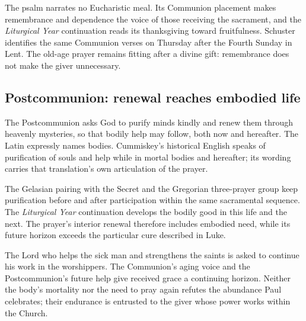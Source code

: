 The psalm narrates no Eucharistic meal. Its Communion placement makes remembrance and dependence the voice of those receiving the sacrament, and the \textit{Liturgical Year} continuation reads its thanksgiving toward fruitfulness. Schuster identifies the same Communion verses on Thursday after the Fourth Sunday in Lent. The old-age prayer remains fitting after a divine gift: remembrance does not make the giver unnecessary. 

\subsection*{Postcommunion: renewal reaches embodied life}
The Postcommunion asks God to purify minds kindly and renew them through heavenly mysteries, so that bodily help may follow, both now and hereafter. The Latin expressly names bodies. Cummiskey's historical English speaks of purification of souls and help while in mortal bodies and hereafter; its wording carries that translation's own articulation of the prayer.

The Gelasian pairing with the Secret and the Gregorian three-prayer group keep purification before and after participation within the same sacramental sequence. The \textit{Liturgical Year} continuation develops the bodily good in this life and the next. The prayer's interior renewal therefore includes embodied need, while its future horizon exceeds the particular cure described in Luke. 

The Lord who helps the sick man and strengthens the saints is asked to continue his work in the worshippers. The Communion's aging voice and the Postcommunion's future help give received grace a continuing horizon. Neither the body's mortality nor the need to pray again refutes the abundance Paul celebrates; their endurance is entrusted to the giver whose power works within the Church. 
